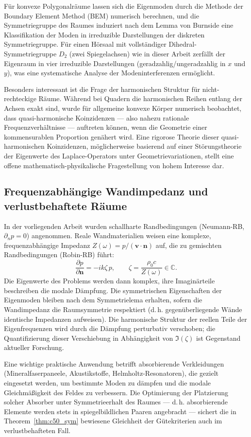 ﻿\documentclass[12pt, a4paper]{article}
\theoremstyle{definition}
\theoremstyle{remark}
\newcommand{\pfrac}[2]{\frac{\partial #1}{\partial #2}}
\begin{document}
Für konvexe Polygonalräume lassen sich die Eigenmoden durch die Methode
der Boundary Element Method (BEM) numerisch berechnen, und die Symmetriegruppe
des Raumes induziert nach dem Lemma von Burnside eine Klassifikation der Moden
in irreduzible Darstellungen der diskreten Symmetriegruppe. Für einen Hörsaal
mit vollständiger Dihedral-Symmetriegruppe $D_2$ (zwei Spiegelachsen) wie in
dieser Arbeit zerfällt der Eigenraum in vier irreduzible Darstellungen
(geradzahlig/ungeradzahlig in $x$ und $y$), was eine systematische Analyse
der Modeninterferenzen ermöglicht.

Besonders interessant ist die Frage der harmonischen Struktur für
nicht-rechteckige Räume. Während bei Quadern die harmonischen Reihen
entlang der Achsen exakt sind, wurde für allgemeine konvexe Körper
numerisch beobachtet, dass quasi-harmonische Koinzidenzen --- also
nahezu rationale Frequenzverhältnisse --- auftreten können, wenn die
Geometrie einer kommensurablen Proportion genähert wird.
Eine rigorose Theorie dieser quasi-harmonischen Koinzidenzen, möglicherweise
basierend auf einer Störungstheorie der Eigenwerte des Laplace-Operators
unter Geometrievariationen, stellt eine offene mathematisch-physikalische
Fragestellung von hohem Interesse dar.

\subsection{Frequenzabhängige Wandimpedanz und verlustbehaftete Räume}

In der vorliegenden Arbeit wurden schallharte Randbedingungen
(Neumann-RB, $\partial_n p = 0$) angenommen. Reale Wandmaterialien
weisen eine komplexe, frequenzabhängige Impedanz
$Z(\omega) = p/(\mathbf{v}\cdot\mathbf{n})$ auf, die zu
gemischten Randbedingungen (Robin-RB) führt:
\[
  \pfrac{p}{\mathbf{n}} = -ik\zeta\,p, \qquad
  \zeta = \frac{\rho_0 c}{Z(\omega)} \in \mathbb{C}.
\]
Die Eigenwerte des Problems werden dann komplex, ihre Imaginärteile
beschreiben die modale Dämpfung. Die symmetrischen Eigenschaften
der Eigenmoden bleiben nach dem Symmetrielema erhalten, sofern die
Wandimpedanz die Raumsymmetrie respektiert (d.\,h. gegenüberliegende
Wände identische Impedanzen aufweisen). Die harmonische Struktur
der reellen Teile der Eigenfrequenzen wird durch die Dämpfung
perturbativ verschoben; die Quantifizierung dieser Verschiebung
in Abhängigkeit von $\Im(\zeta)$ ist Gegenstand aktueller Forschung.

Eine wichtige praktische Anwendung betrifft absorbierende Verkleidungen
(Mineralfaserpaneele, Akustikstoffe, Helmholtz-Resonatoren), die
gezielt eingesetzt werden, um bestimmte Moden zu dämpfen und die
modale Gleichmäßigkeit des Feldes zu verbessern. Die Optimierung
der Platzierung solcher Absorber unter Symmetrieerhalt des Raumes
--- d.\,h. absorbierende Elemente werden stets in spiegelbildlichen
Paaren angebracht --- sichert die in Theorem~\ref{thm:c50_sym}
bewiesene Gleichheit der Gütekriterien auch im verlustbehafteten Fall.
\end{document}
